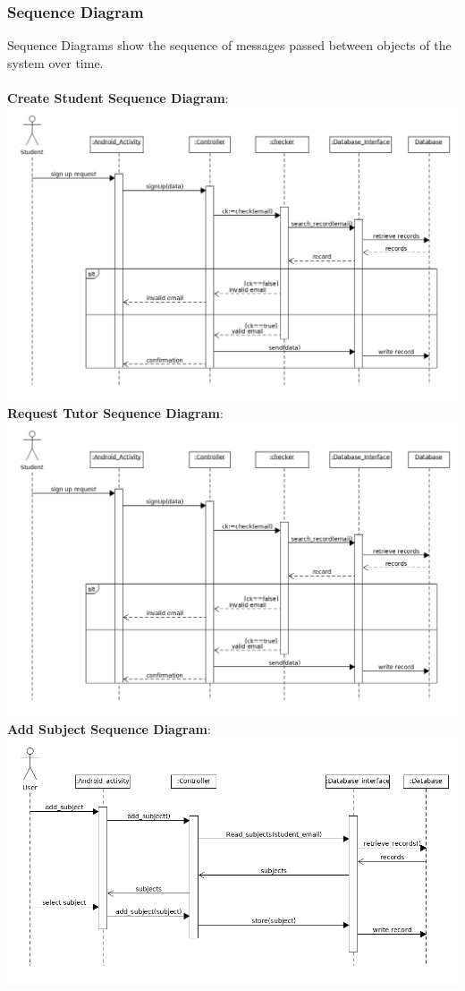 \documentclass[12pt]{article}
\begin{document}
\subsubsection{Sequence Diagram}
Sequence Diagrams show the sequence of messages passed between objects of the system over time.\\
\\\textbf{Create Student Sequence Diagram}:\\
\includegraphics[width=140mm]{./sequence_diagram/create_student.png}
\textbf{Request Tutor Sequence Diagram}:\\
\includegraphics[width=140mm]{./sequence_diagram/request_tutor.png}
\textbf{Add Subject Sequence Diagram}:\\
\includegraphics[width=140mm]{./sequence_diagram/add_subject.png}
\end{document}
